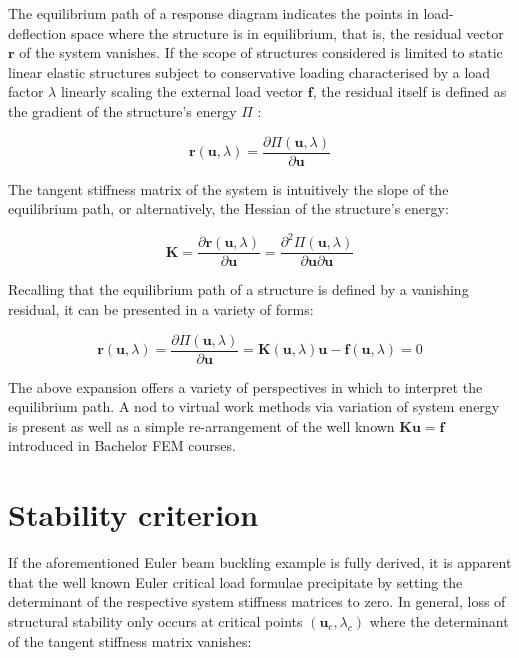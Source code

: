 The equilibrium path of a response diagram indicates the points in load-deflection space where the structure is in equilibrium, that is, the residual vector $\mathbf{r}$ of the system vanishes. If the scope of structures considered is limited to static linear elastic structures subject to conservative loading characterised by a load factor $\lambda$ linearly scaling the external load vector $\mathbf{f}$, the residual itself is defined as the gradient of the structure's energy $\Pi$ \cite{FelippaNFEMCrit2016}:

\begin{equation}
\mathbf{r}(\mathbf{u},\lambda) = \frac{\partial \Pi (\mathbf{u},\lambda)}{\partial \mathbf{u}}
\label{eqstab0}
\end{equation}

The tangent stiffness matrix of the system is intuitively the slope of the equilibrium path, or alternatively, the Hessian of the structure's energy:

\begin{equation} 
\mathbf{K} = 
\frac{\partial \mathbf{r} (\mathbf{u},\lambda)}{\partial \mathbf{u}} = 
\frac{\partial^2 \Pi (\mathbf{u},\lambda)}{\partial \mathbf{u}\partial \mathbf{u}}
\label{eqstab01}
\end{equation}

Recalling that the equilibrium path of a structure is defined by a vanishing residual, it can be presented in a variety of forms:

\begin{equation} 
\mathbf{r}(\mathbf{u},\lambda) = 
\frac{\partial \Pi (\mathbf{u},\lambda)}{\partial \mathbf{u}} =
\mathbf{K}(\mathbf{u},\lambda) \mathbf{u} - \mathbf{f}(\mathbf{u},\lambda) =
0
\label{eqstab02}
\end{equation}

The above expansion offers a variety of perspectives in which to interpret the equilibrium path. A nod to virtual work methods via variation of system energy is present as well as a simple re-arrangement of the well known $\mathbf{Ku} = \mathbf{f}$ introduced in Bachelor FEM courses.

\section{Stability criterion}
 If the aforementioned Euler beam buckling example is fully derived, it is apparent that the well known Euler critical load formulae precipitate by setting the determinant of the respective system stiffness matrices to zero. In general, loss of structural stability only occurs at critical points $(\mathbf{u}_c,\lambda_c)$ where the determinant of the tangent stiffness matrix vanishes:
 
